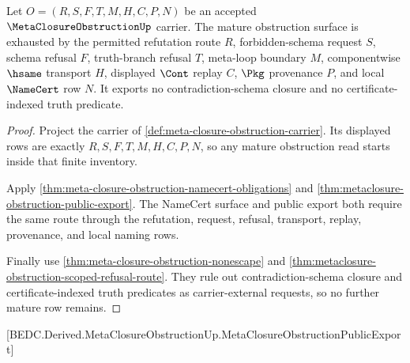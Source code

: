 \begin{theorem}
\label{thm:metaclosure-obstruction-mature-refusal-completeness}
Let $O=(R,S,F,T,M,H,C,P,N)$ be an accepted $\MetaClosureObstructionUp$ carrier. The mature obstruction surface is exhausted by the permitted refutation route $R$, forbidden-schema request $S$, schema refusal $F$, truth-branch refusal $T$, meta-loop boundary $M$, componentwise $\hsame$ transport $H$, displayed $\Cont$ replay $C$, $\Pkg$ provenance $P$, and local $\NameCert$ row $N$. It exports no contradiction-schema closure and no certificate-indexed truth predicate.
\end{theorem}
\begin{proof}
Project the carrier of \autoref{def:meta-closure-obstruction-carrier}. Its displayed rows are exactly $R,S,F,T,M,H,C,P,N$, so any mature obstruction read starts inside that finite inventory.

Apply \autoref{thm:meta-closure-obstruction-namecert-obligations} and \autoref{thm:metaclosure-obstruction-public-export}. The NameCert surface and public export both require the same route through the refutation, request, refusal, transport, replay, provenance, and local naming rows.

Finally use \autoref{thm:meta-closure-obstruction-nonescape} and \autoref{thm:metaclosure-obstruction-scoped-refusal-route}. They rule out contradiction-schema closure and certificate-indexed truth predicates as carrier-external requests, so no further mature row remains.
\end{proof}

[BEDC.Derived.MetaClosureObstructionUp.MetaClosureObstructionPublicExport]

\begin{closurestatus}{\MetaClosureObstructionUp}
  \theoryclosure{\matureClosure}
  \formalstatus{\auditCleanV}
\end{closurestatus}
